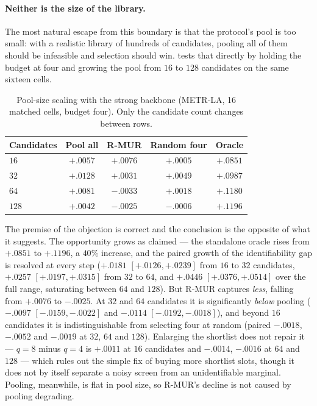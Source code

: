 \paragraph{Neither is the size of the library.} The most natural escape from
this boundary is that the protocol's pool is too small: with a realistic library
of hundreds of candidates, pooling all of them should be infeasible and
selection should win.  tests that directly by holding the
budget at four and growing the pool from $16$ to $128$ candidates on the same
sixteen cells.

\begin{table}[t]
 \centering
 \small
 \caption{Pool-size scaling with the strong backbone (METR-LA, 16 matched
 cells, budget four). Only the candidate count changes between rows.}
 \label{tab:pool-size}
 \begin{tabular}{lcccc}
  \toprule
  Candidates & Pool all & R-MUR & Random four & Oracle\\
  \midrule
  $16$  & $+.0057$ & $+.0076$ & $+.0005$ & $+.0851$\\
  $32$  & $+.0128$ & $+.0031$ & $+.0049$ & $+.0987$\\
  $64$  & $+.0081$ & $-.0033$ & $+.0018$ & $+.1180$\\
  $128$ & $+.0042$ & $-.0025$ & $-.0006$ & $+.1196$\\
  \bottomrule \end{tabular}
\end{table}

The premise of the objection is correct and the conclusion is the opposite of
what it suggests. The opportunity grows as claimed --- the standalone oracle
rises from $+.0851$ to $+.1196$, a $40\%$ increase, and the paired growth of
the identifiability gap is resolved at every step ($+.0181$
$[+.0126,+.0239]$ from $16$ to $32$ candidates, $+.0257$ $[+.0197,+.0315]$ from
$32$ to $64$, and $+.0446$ $[+.0376,+.0514]$ over the full range, saturating
between $64$ and $128$). But R-MUR captures \emph{less}, falling from $+.0076$ to
$-.0025$. At $32$ and $64$ candidates it is significantly \emph{below} pooling
($-.0097$ $[-.0159,-.0022]$ and $-.0114$ $[-.0192,-.0018]$), and beyond $16$
candidates it is indistinguishable from selecting four at random (paired
$-.0018$, $-.0052$ and $-.0019$ at $32$, $64$ and $128$). Enlarging the
shortlist does not repair it --- $q=8$ minus $q=4$ is $+.0011$ at $16$
candidates and $-.0014$, $-.0016$ at $64$ and $128$ --- which rules out the
simple fix of buying more shortlist slots, though it does not by itself
separate a noisy screen from an unidentifiable marginal. Pooling, meanwhile, is
flat in pool size, so R-MUR's decline is not caused by pooling degrading.

